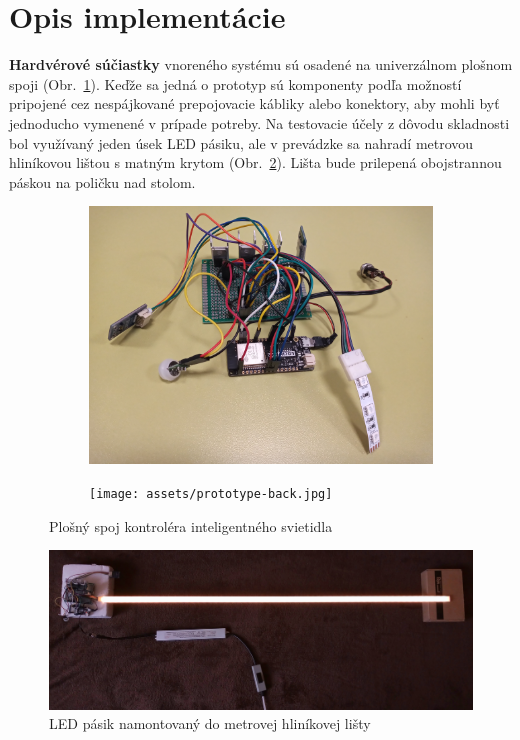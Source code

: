 \documentclass[12pt, a4paper]{article}
\begin{document}
\section{Opis implementácie}
\textbf{Hardvérové súčiastky} vnoreného systému sú osadené na univerzálnom plošnom spoji (Obr.~\ref{fig:pcb}). Keďže sa jedná o prototyp sú komponenty podľa možností pripojené cez nespájkované prepojovacie kábliky alebo konektory, aby mohli byť jednoducho vymenené v prípade potreby. Na testovacie účely z dôvodu skladnosti bol využívaný jeden úsek LED pásiku, ale v prevádzke sa nahradí metrovou hliníkovou lištou s matným krytom (Obr.~\ref{fig:lamp-full}). Lišta bude prilepená obojstrannou páskou na poličku nad stolom.

\begin{figure}[h]
\centering
\begin{subfigure}[h]{0.48\textwidth}
	\centering
	\includegraphics[width=\textwidth]{assets/prototype.jpg}
\end{subfigure}
\hfill
\begin{subfigure}[h]{0.48\textwidth}
	\centering
	\texttt{[image: assets/prototype-back.jpg]}
\end{subfigure}
\caption{Plošný spoj kontroléra inteligentného svietidla}
\label{fig:pcb}
\end{figure}

\begin{figure}[h]
\includegraphics[width=\textwidth]{assets/lamp.jpg}
\caption{LED pásik namontovaný do metrovej hliníkovej lišty}
\label{fig:lamp-full}
\end{figure}
\end{document}
